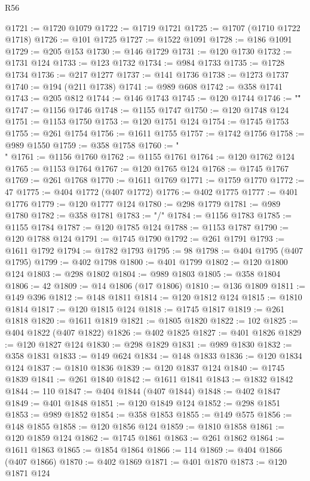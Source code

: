 \begin{lexlean}{R56}
\begin{coremodule}
@1721 := @1720 @1079
@1722 := @1719 @1721
@1725 := @1707 (@1710 @1722 @1718)
@1726 := @101 @1725
@1727 := @1522 @1091
@1728 := @186 @1091
@1729 := @205 @153
@1730 := @146 @1729
@1731 := @120 @1730
@1732 := @1731 @124
@1733 := @123 @1732
@1734 := @984 @1733
@1735 := @1728 @1734
@1736 := @217 @1277
@1737 := @141 @1736
@1738 := @1273 @1737
@1740 := @194 (@211 @1738)
@1741 := @989 @608
@1742 := @358 @1741
@1743 := @205 @812
@1744 := @146 @1743
@1745 := @120 @1744
@1746 := "\""
@1747 := @1156 @1746
@1748 := @1155 @1747
@1750 := @120 @1748 @124
@1751 := @1153 @1750
@1753 := @120 @1751 @124
@1754 := @1745 @1753
@1755 := @261 @1754
@1756 := @1611 @1755
@1757 := @1742 @1756
@1758 := @989 @1550
@1759 := @358 @1758
@1760 := "\\"
@1761 := @1156 @1760
@1762 := @1155 @1761
@1764 := @120 @1762 @124
@1765 := @1153 @1764
@1767 := @120 @1765 @124
@1768 := @1745 @1767
@1769 := @261 @1768
@1770 := @1611 @1769
@1771 := @1759 @1770
@1772 := 47
@1775 := @404 @1772 (@407 @1772)
@1776 := @402 @1775
@1777 := @401 @1776
@1779 := @120 @1777 @124
@1780 := @298 @1779
@1781 := @989 @1780
@1782 := @358 @1781
@1783 := "/"
@1784 := @1156 @1783
@1785 := @1155 @1784
@1787 := @120 @1785 @124
@1788 := @1153 @1787
@1790 := @120 @1788 @124
@1791 := @1745 @1790
@1792 := @261 @1791
@1793 := @1611 @1792
@1794 := @1782 @1793
@1795 := 98
@1798 := @404 @1795 (@407 @1795)
@1799 := @402 @1798
@1800 := @401 @1799
@1802 := @120 @1800 @124
@1803 := @298 @1802
@1804 := @989 @1803
@1805 := @358 @1804
@1806 := 42
@1809 := @14 @1806 (@17 @1806)
@1810 := @136 @1809
@1811 := @149 @396
@1812 := @148 @1811
@1814 := @120 @1812 @124
@1815 := @1810 @1814
@1817 := @120 @1815 @124
@1818 := @1745 @1817
@1819 := @261 @1818
@1820 := @1611 @1819
@1821 := @1805 @1820
@1822 := 102
@1825 := @404 @1822 (@407 @1822)
@1826 := @402 @1825
@1827 := @401 @1826
@1829 := @120 @1827 @124
@1830 := @298 @1829
@1831 := @989 @1830
@1832 := @358 @1831
@1833 := @149 @624
@1834 := @148 @1833
@1836 := @120 @1834 @124
@1837 := @1810 @1836
@1839 := @120 @1837 @124
@1840 := @1745 @1839
@1841 := @261 @1840
@1842 := @1611 @1841
@1843 := @1832 @1842
@1844 := 110
@1847 := @404 @1844 (@407 @1844)
@1848 := @402 @1847
@1849 := @401 @1848
@1851 := @120 @1849 @124
@1852 := @298 @1851
@1853 := @989 @1852
@1854 := @358 @1853
@1855 := @149 @575
@1856 := @148 @1855
@1858 := @120 @1856 @124
@1859 := @1810 @1858
@1861 := @120 @1859 @124
@1862 := @1745 @1861
@1863 := @261 @1862
@1864 := @1611 @1863
@1865 := @1854 @1864
@1866 := 114
@1869 := @404 @1866 (@407 @1866)
@1870 := @402 @1869
@1871 := @401 @1870
@1873 := @120 @1871 @124

\end{coremodule}
\end{lexlean}
